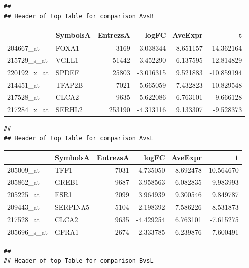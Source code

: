 \documentclass{article}\usepackage[]{graphicx}\usepackage[]{color}
\makeatletter
\newenvironment{kframe}{%
 \def\at@end@of@kframe{}%
 \ifinner\ifhmode%
  \def\at@end@of@kframe{\end{minipage}}%
  \begin{minipage}{\columnwidth}%
 \fi\fi%
 \def\FrameCommand##1{\hskip\@totalleftmargin \hskip-\fboxsep
 \colorbox{shadecolor}{##1}\hskip-\fboxsep
     \hskip-\linewidth \hskip-\@totalleftmargin \hskip\columnwidth}%
 \MakeFramed {\advance\hsize-\width
   \@totalleftmargin\z@ \linewidth\hsize
   \@setminipage}}%
 {\par\unskip\endMakeFramed%
 \at@end@of@kframe}
\newenvironment{knitrout}{}{} %
\makeatother
\begin{document}
\begin{knitrout}
\color{fgcolor}\begin{kframe}
\begin{verbatim}
## 
## Header of top Table for comparison AvsB
\end{verbatim}
\end{kframe}


\begin{tabular}{l|l|r|r|r|r}
\hline
  & SymbolsA & EntrezsA & logFC & AveExpr & t\\
\hline
204667\_at & FOXA1 & 3169 & -3.038344 & 8.651157 & -14.362164\\
\hline
215729\_s\_at & VGLL1 & 51442 & 3.452290 & 6.137595 & 12.814829\\
\hline
220192\_x\_at & SPDEF & 25803 & -3.016315 & 9.521883 & -10.859194\\
\hline
214451\_at & TFAP2B & 7021 & -5.665059 & 7.432823 & -10.829548\\
\hline
217528\_at & CLCA2 & 9635 & -5.622086 & 6.763101 & -9.666128\\
\hline
217284\_x\_at & SERHL2 & 253190 & -4.313116 & 9.133307 & -9.528373\\
\hline
\end{tabular}\begin{kframe}\begin{verbatim}
## 
## Header of top Table for comparison AvsL
\end{verbatim}
\end{kframe}


\begin{tabular}{l|l|r|r|r|r}
\hline
  & SymbolsA & EntrezsA & logFC & AveExpr & t\\
\hline
205009\_at & TFF1 & 7031 & 4.735050 & 8.692478 & 10.564670\\
\hline
205862\_at & GREB1 & 9687 & 3.958563 & 6.082835 & 9.983993\\
\hline
205225\_at & ESR1 & 2099 & 3.964939 & 9.300546 & 9.849787\\
\hline
209443\_at & SERPINA5 & 5104 & 2.198392 & 7.586226 & 8.531873\\
\hline
217528\_at & CLCA2 & 9635 & -4.429254 & 6.763101 & -7.615275\\
\hline
205696\_s\_at & GFRA1 & 2674 & 2.333785 & 6.239876 & 7.600491\\
\hline
\end{tabular}\begin{kframe}\begin{verbatim}
## 
## Header of top Table for comparison BvsL
\end{verbatim}
\end{kframe}



\end{knitrout}
\end{document}
